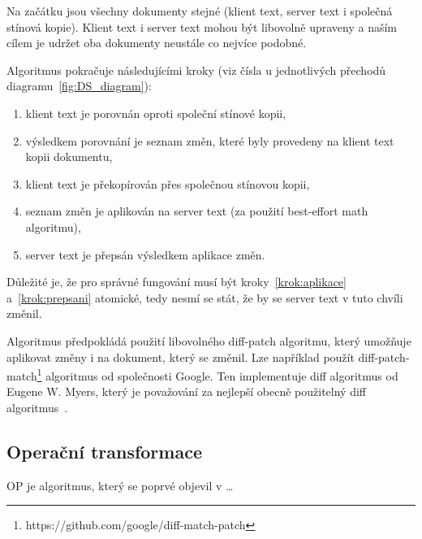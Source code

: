 Na začátku jsou všechny dokumenty stejné (klient text, server text i společná stínová kopie).
Klient text i server text mohou být libovolně upraveny a naším cílem je udržet oba dokumenty neustále co nejvíce podobné.

Algoritmus pokračuje následujícími kroky (viz čísla u jednotlivých přechodů diagramu~\ref{fig:DS_diagram}):
\begin{enumerate}
    \item klient text je porovnán oproti společní stínové kopii,
    \item výsledkem porovnání je seznam změn, které byly provedeny na klient text kopii dokumentu,
    \item klient text je překopírován přes společnou stínovou kopii,
    \item seznam změn je aplikován na server text (za použití best-effort math algoritmu),\label{krok:aplikace}
    \item server text je přepsán výsledkem aplikace změn.\label{krok:prepsani}
\end{enumerate}

Důležité je, že pro správné fungování musí být kroky~\ref{krok:aplikace} a~\ref{krok:prepsani} atomické, tedy nesmí se stát, že by se server text v tuto chvíli změnil.

Algoritmus předpokládá použití libovolného diff-patch algoritmu, který umožňuje aplikovat změny i na dokument, který se změnil.
Lze například použít diff-patch-match\footnote{https://github.com/google/diff-match-patch} algoritmus od společnosti Google.
Ten implementuje diff algoritmus od Eugene W. Myers, který je považování za nejlepší obecně použitelný diff algoritmus~\cite{ds:myers_diff}.~\cite{ds:neil_paper, ds:neil_video}

\subsection{Operační transformace}\label{subsec:operacniTransformace}

\gls{OP} je algoritmus, který se poprvé objevil v \ldots

